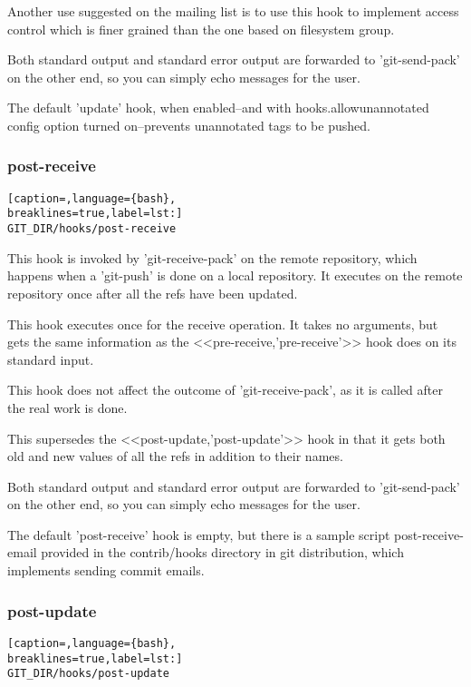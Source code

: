 Another use suggested on the mailing list is to use this hook to implement
access control which is finer grained than the one based on filesystem group.

Both standard output and standard error output are forwarded to 'git-send-pack'
on the other end, so you can simply echo messages for the user.

The default 'update' hook, when enabled--and with hooks.allowunannotated config
option turned on--prevents unannotated tags to be pushed.

\subsubsection{post-receive}
\lstset{basicstyle=\scriptsize, numbers=none, captionpos=b, tabsize=4}
\begin{lstlisting}[caption=,language={bash},
breaklines=true,label=lst:]
GIT_DIR/hooks/post-receive
\end{lstlisting}

This hook is invoked by 'git-receive-pack' on the remote repository, which
happens when a 'git-push' is done on a local repository. It executes on the
remote repository once after all the refs have been updated.

This hook executes once for the receive operation. It takes no arguments, but
gets the same information as the <<pre-receive,'pre-receive'>> hook does on its
standard input.

This hook does not affect the outcome of 'git-receive-pack', as it is called
after the real work is done.

This supersedes the <<post-update,'post-update'>> hook in that it gets both old
and new values of all the refs in addition to their names.

Both standard output and standard error output are forwarded to 'git-send-pack'
on the other end, so you can simply echo messages for the user.

The default 'post-receive' hook is empty, but there is a sample script
post-receive-email provided in the contrib/hooks directory in git distribution,
which implements sending commit emails.

\subsubsection{post-update}
\lstset{basicstyle=\scriptsize, numbers=none, captionpos=b, tabsize=4}
\begin{lstlisting}[caption=,language={bash},
breaklines=true,label=lst:]
GIT_DIR/hooks/post-update
\end{lstlisting}

